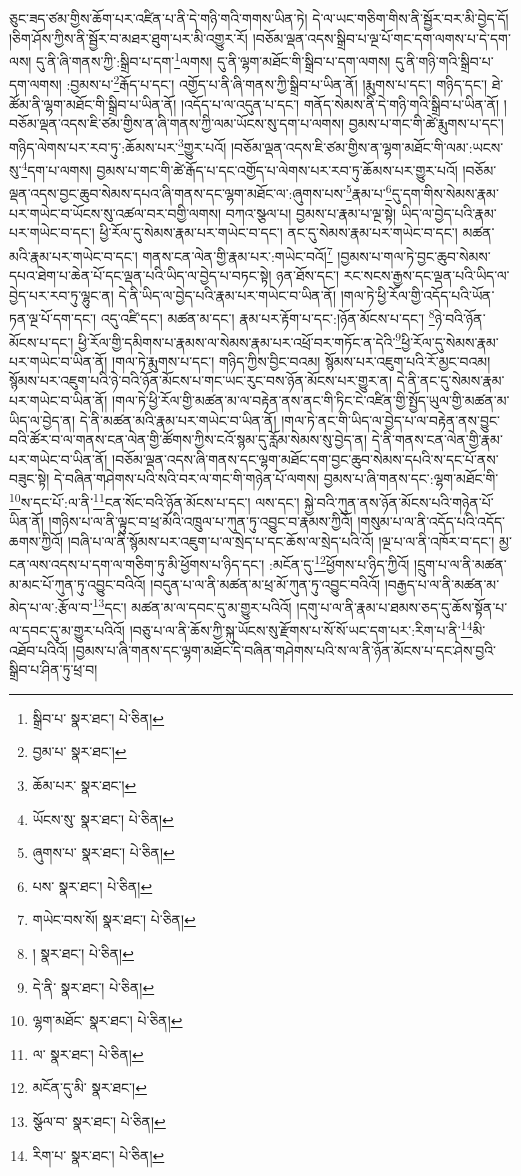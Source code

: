 ཅུང་ཟད་ཙམ་གྱིས་ཆོག་པར་འཛིན་པ་ནི་དེ་གཉི་གའི་གགས་ཡིན་ཏེ། དེ་ལ་ཡང་གཅིག་གིས་ནི་སྦྱོར་བར་མི་བྱེད་དོ། །ཅིག་ཤོས་ཀྱིས་ནི་སྦྱོར་བ་མཐར་ཐུག་པར་མི་འགྱུར་རོ། །བཅོམ་ལྡན་འདས་སྒྲིབ་པ་ལྔ་པོ་གང་དག་ལགས་པ་དེ་དག་ལས། དུ་ནི་ཞི་གནས་ཀྱི་:སྒྲིབ་པ་དག་\footnote{སྒྲིབ་པ་  སྣར་ཐང་།  པེ་ཅིན། }ལགས། དུ་ནི་ལྷག་མཐོང་གི་སྒྲིབ་པ་དག་ལགས། དུ་ནི་གཉི་གའི་སྒྲིབ་པ་དག་ལགས། :བྱམས་པ་\footnote{བྱམ་པ་  སྣར་ཐང་། }རྒོད་པ་དང་། འགྱོད་པ་ནི་ཞི་གནས་ཀྱི་སྒྲིབ་པ་ཡིན་ནོ། །རྨུགས་པ་དང་། གཉིད་དང་། ཐེ་ཚོམ་ནི་ལྷག་མཐོང་གི་སྒྲིབ་པ་ཡིན་ནོ། །འདོད་པ་ལ་འདུན་པ་དང་། གནོད་སེམས་ནི་དེ་གཉི་གའི་སྒྲིབ་པ་ཡིན་ནོ། །བཅོམ་ལྡན་འདས་ཇི་ཙམ་གྱིས་ན་ཞི་གནས་ཀྱི་ལམ་ཡོངས་སུ་དག་པ་ལགས། བྱམས་པ་གང་གི་ཚེ་རྨུགས་པ་དང་། གཉིད་ལེགས་པར་རབ་ཏུ་:ཆོམས་པར་\footnote{ཆོམ་པར་  སྣར་ཐང་། }གྱུར་པའོ། །བཅོམ་ལྡན་འདས་ཇི་ཙམ་གྱིས་ན་ལྷག་མཐོང་གི་ལམ་:ཡངས་སུ་\footnote{ཡོངས་སུ་  སྣར་ཐང་།  པེ་ཅིན། }དག་པ་ལགས། བྱམས་པ་གང་གི་ཚེ་རྒོད་པ་དང་འགྱོད་པ་ལེགས་པར་རབ་ཏུ་ཆོམས་པར་གྱུར་པའོ། །བཅོམ་ལྡན་འདས་བྱང་ཆུབ་སེམས་དཔའ་ཞི་གནས་དང་ལྷག་མཐོང་ལ་:ཞུགས་པས་\footnote{ཞུགས་པ་  སྣར་ཐང་།  པེ་ཅིན། }རྣམ་པ་\footnote{པས་  སྣར་ཐང་།  པེ་ཅིན། }དུ་དག་གིས་སེམས་རྣམ་པར་གཡེང་བ་ཡོངས་སུ་འཚལ་བར་བགྱི་ལགས། བཀའ་སྩལ་པ། བྱམས་པ་རྣམ་པ་ལྔ་སྟེ། ཡིད་ལ་བྱེད་པའི་རྣམ་པར་གཡེང་བ་དང་། ཕྱི་རོལ་དུ་སེམས་རྣམ་པར་གཡེང་བ་དང་། ནང་དུ་སེམས་རྣམ་པར་གཡེང་བ་དང་། མཚན་མའི་རྣམ་པར་གཡེང་བ་དང་། གནས་ངན་ལེན་གྱི་རྣམ་པར་:གཡེང་བའོ།\footnote{གཡེང་བས་སོ།  སྣར་ཐང་།  པེ་ཅིན། } །བྱམས་པ་གལ་ཏེ་བྱང་ཆུབ་སེམས་དཔའ་ཐེག་པ་ཆེན་པོ་དང་ལྡན་པའི་ཡིད་ལ་བྱེད་པ་བཏང་སྟེ། ཉན་ཐོས་དང་། རང་སངས་རྒྱས་དང་ལྡན་པའི་ཡིད་ལ་བྱེད་པར་རབ་ཏུ་ལྷུང་ན། དེ་ནི་ཡིད་ལ་བྱེད་པའི་རྣམ་པར་གཡེང་བ་ཡིན་ནོ། །གལ་ཏེ་ཕྱི་རོལ་གྱི་འདོད་པའི་ཡོན་ཏན་ལྔ་པོ་དག་དང་། འདུ་འཛི་དང་། མཚན་མ་དང་། རྣམ་པར་རྟོག་པ་དང་:།ཉོན་མོངས་པ་དང་། \footnote{།   སྣར་ཐང་།  པེ་ཅིན། }ཉེ་བའི་ཉོན་མོངས་པ་དང་། ཕྱི་རོལ་གྱི་དམིགས་པ་རྣམས་ལ་སེམས་རྣམ་པར་འཕྲོ་བར་གཏོང་ན་དེའི་\footnote{དེ་ནི་  སྣར་ཐང་།  པེ་ཅིན། }ཕྱི་རོལ་དུ་སེམས་རྣམ་པར་གཡེང་བ་ཡིན་ནོ། །གལ་ཏེ་རྨུགས་པ་དང་། གཉིད་ཀྱིས་བྱིང་བའམ། སྙོམས་པར་འཇུག་པའི་རོ་མྱང་བའམ། སྙོམས་པར་འཇུག་པའི་ཉེ་བའི་ཉོན་མོངས་པ་གང་ཡང་རུང་བས་ཉོན་མོངས་པར་གྱུར་ན། དེ་ནི་ནང་དུ་སེམས་རྣམ་པར་གཡེང་བ་ཡིན་ནོ། །གལ་ཏེ་ཕྱི་རོལ་གྱི་མཚན་མ་ལ་བརྟེན་ནས་ནང་གི་ཏིང་ངེ་འཛིན་གྱི་སྤྱོད་ཡུལ་གྱི་མཚན་མ་ཡིད་ལ་བྱེད་ན། དེ་ནི་མཚན་མའི་རྣམ་པར་གཡེང་བ་ཡིན་ནོ། །གལ་ཏེ་ནང་གི་ཡིད་ལ་བྱེད་པ་ལ་བརྟེན་ནས་བྱུང་བའི་ཚོར་བ་ལ་གནས་ངན་ལེན་གྱི་ཚོགས་ཀྱིས་ངའོ་སྙམ་དུ་རློམ་སེམས་སུ་བྱེད་ན། དེ་ནི་གནས་ངན་ལེན་གྱི་རྣམ་པར་གཡེང་བ་ཡིན་ནོ། །བཅོམ་ལྡན་འདས་ཞི་གནས་དང་ལྷག་མཐོང་དག་བྱང་ཆུབ་སེམས་དཔའི་ས་དང་པོ་ནས་བཟུང་སྟེ། དེ་བཞིན་གཤེགས་པའི་སའི་བར་ལ་གང་གི་གཉེན་པོ་ལགས། བྱམས་པ་ཞི་གནས་དང་:ལྷག་མཐོང་གི་\footnote{ལྷག་མཐོང་  སྣར་ཐང་།  པེ་ཅིན། }ས་དང་པོ་:ལ་ནི་\footnote{ལ་  སྣར་ཐང་།  པེ་ཅིན། }ངན་སོང་བའི་ཉོན་མོངས་པ་དང་། ལས་དང་། སྐྱེ་བའི་ཀུན་ནས་ཉོན་མོངས་པའི་གཉེན་པོ་ཡིན་ནོ། །གཉིས་པ་ལ་ནི་ལྟུང་བ་ཕྲ་མོའི་འཁྲུལ་པ་ཀུན་ཏུ་འབྱུང་བ་རྣམས་ཀྱིའོ། །གསུམ་པ་ལ་ནི་འདོད་པའི་འདོད་ཆགས་ཀྱིའོ། །བཞི་པ་ལ་ནི་སྙོམས་པར་འཇུག་པ་ལ་སྲེད་པ་དང་ཆོས་ལ་སྲེད་པའི་འོ། །ལྔ་པ་ལ་ནི་འཁོར་བ་དང་། མྱ་ངན་ལས་འདས་པ་དག་ལ་གཅིག་ཏུ་མི་ཕྱོགས་པ་ཉིད་དང་། :མངོན་དུ་\footnote{མངོན་དུ་མི་  སྣར་ཐང་། }ཕྱོགས་པ་ཉིད་ཀྱིའོ། །དྲུག་པ་ལ་ནི་མཚན་མ་མང་པོ་ཀུན་ཏུ་འབྱུང་བའིའོ། །བདུན་པ་ལ་ནི་མཚན་མ་ཕྲ་མོ་ཀུན་ཏུ་འབྱུང་བའིའོ། །བརྒྱད་པ་ལ་ནི་མཚན་མ་མེད་པ་ལ་:རྩོལ་བ་\footnote{སྩོལ་བ་  སྣར་ཐང་།  པེ་ཅིན། }དང་། མཚན་མ་ལ་དབང་དུ་མ་གྱུར་པའིའོ། །དགུ་པ་ལ་ནི་རྣམ་པ་ཐམས་ཅད་དུ་ཆོས་སྟོན་པ་ལ་དབང་དུ་མ་གྱུར་པའིའོ། །བཅུ་པ་ལ་ནི་ཆོས་ཀྱི་སྐུ་ཡོངས་སུ་རྫོགས་པ་སོ་སོ་ཡང་དག་པར་:རིག་པ་ནི་\footnote{རིག་པ་  སྣར་ཐང་།  པེ་ཅིན། }མི་འཐོབ་པའིའོ། །བྱམས་པ་ཞི་གནས་དང་ལྷག་མཐོང་དེ་བཞིན་གཤེགས་པའི་ས་ལ་ནི་ཉོན་མོངས་པ་དང་ཤེས་བྱའི་སྒྲིབ་པ་ཤིན་ཏུ་ཕྲ་བ། 